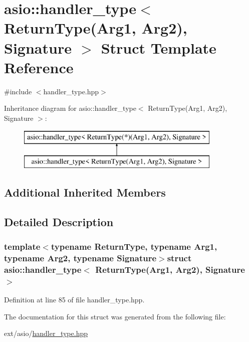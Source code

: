 \hypertarget{structasio_1_1handler__type_3_01_return_type_07_arg1_00_01_arg2_08_00_01_signature_01_4}{}\section{asio\+:\+:handler\+\_\+type$<$ Return\+Type(Arg1, Arg2), Signature $>$ Struct Template Reference}
\label{structasio_1_1handler__type_3_01_return_type_07_arg1_00_01_arg2_08_00_01_signature_01_4}


{\ttfamily \#include $<$handler\+\_\+type.\+hpp$>$}

Inheritance diagram for asio\+:\+:handler\+\_\+type$<$ Return\+Type(Arg1, Arg2), Signature $>$\+:\begin{figure}[H]
\begin{center}
\leavevmode
\includegraphics[height=2.000000cm]{structasio_1_1handler__type_3_01_return_type_07_arg1_00_01_arg2_08_00_01_signature_01_4}
\end{center}
\end{figure}
\subsection*{Additional Inherited Members}


\subsection{Detailed Description}
\subsubsection*{template$<$typename Return\+Type, typename Arg1, typename Arg2, typename Signature$>$struct asio\+::handler\+\_\+type$<$ Return\+Type(\+Arg1, Arg2), Signature $>$}



Definition at line 85 of file handler\+\_\+type.\+hpp.



The documentation for this struct was generated from the following file\+:\begin{DoxyCompactItemize}
\item 
ext/asio/\hyperlink{handler__type_8hpp}{handler\+\_\+type.\+hpp}\end{DoxyCompactItemize}
